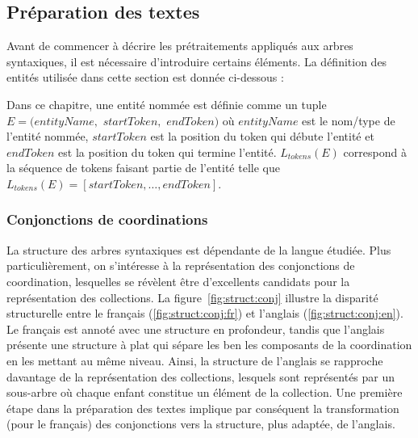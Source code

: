 \subsection{Préparation des textes}
Avant de commencer à décrire les prétraitements appliqués aux arbres syntaxiques, il est nécessaire d'introduire certains éléments.
La définition des entités utilisée dans cette section est donnée ci-dessous :

\begin{definition}
    Dans ce chapitre, une entité nommée est définie comme un tuple $E = (entityName,$ $startToken,$ $endToken)$ où $entityName$ est le nom/type de l'entité nommée, $startToken$ est la position du token qui débute l'entité et $endToken$ est la position du token qui termine l'entité.
    $L_{tokens}(E)$ correspond à la séquence de tokens faisant partie de l'entité telle que $L_{tokens}(E) = [startToken, \dots, endToken]$.
\end{definition}

\subsubsection{Conjonctions de coordinations}
La structure des arbres syntaxiques est dépendante de la langue étudiée.
Plus particulièrement, on s'intéresse à la représentation des conjonctions de coordination, lesquelles se révèlent être d'excellents candidats pour la représentation des collections.
La figure~\ref{fig:struct:conj} illustre la disparité structurelle entre le français (\ref{fig:struct:conj:fr}) et l'anglais (\ref{fig:struct:conj:en}).
Le français est annoté avec une structure en profondeur, tandis que l'anglais présente une structure à plat qui sépare les ben les composants de la coordination en les mettant au même niveau.
Ainsi, la structure de l'anglais se rapproche davantage de la représentation des collections, lesquels sont représentés par un sous-arbre où chaque enfant constitue un élément de la collection.
Une première étape dans la préparation des textes implique par conséquent la transformation (pour le français) des conjonctions vers la structure, plus adaptée, de l'anglais.


